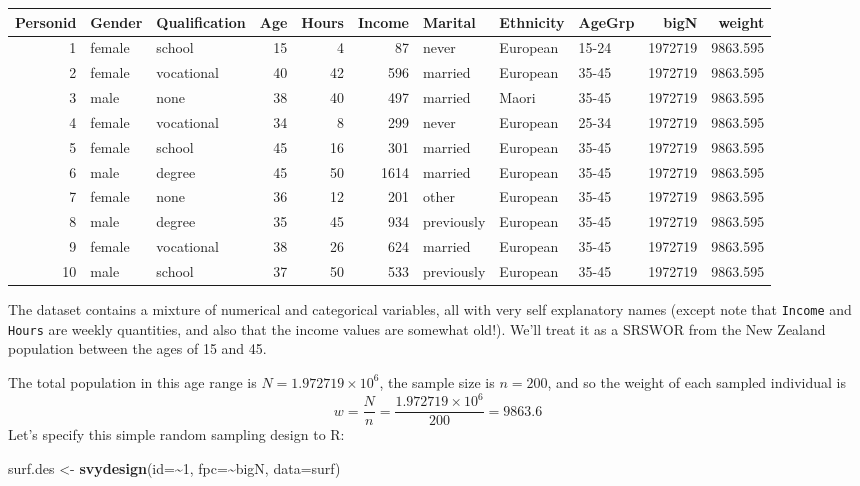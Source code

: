 \documentclass[
]{book}
\newenvironment{Shaded}{\begin{snugshade}}{\end{snugshade}}
\newcommand{\AttributeTok}[1]{\textcolor[rgb]{0.13,0.29,0.53}{#1}}
\newcommand{\DecValTok}[1]{\textcolor[rgb]{0.00,0.00,0.81}{#1}}
\newcommand{\FunctionTok}[1]{\textcolor[rgb]{0.13,0.29,0.53}{\textbf{#1}}}
\newcommand{\NormalTok}[1]{#1}
\newcommand{\OtherTok}[1]{\textcolor[rgb]{0.56,0.35,0.01}{#1}}
\newcommand{\SpecialCharTok}[1]{\textcolor[rgb]{0.81,0.36,0.00}{\textbf{#1}}}
\newcounter{none} %
\begin{document}
\begin{table}
\centering
\begin{tabular}[t]{r|l|l|r|r|r|l|l|l|r|r}
\hline
Personid & Gender & Qualification & Age & Hours & Income & Marital & Ethnicity & AgeGrp & bigN & weight\\
\hline
1 & female & school & 15 & 4 & 87 & never & European & 15-24 & 1972719 & 9863.595\\
\hline
2 & female & vocational & 40 & 42 & 596 & married & European & 35-45 & 1972719 & 9863.595\\
\hline
3 & male & none & 38 & 40 & 497 & married & Maori & 35-45 & 1972719 & 9863.595\\
\hline
4 & female & vocational & 34 & 8 & 299 & never & European & 25-34 & 1972719 & 9863.595\\
\hline
5 & female & school & 45 & 16 & 301 & married & European & 35-45 & 1972719 & 9863.595\\
\hline
6 & male & degree & 45 & 50 & 1614 & married & European & 35-45 & 1972719 & 9863.595\\
\hline
7 & female & none & 36 & 12 & 201 & other & European & 35-45 & 1972719 & 9863.595\\
\hline
8 & male & degree & 35 & 45 & 934 & previously & European & 35-45 & 1972719 & 9863.595\\
\hline
9 & female & vocational & 38 & 26 & 624 & married & European & 35-45 & 1972719 & 9863.595\\
\hline
10 & male & school & 37 & 50 & 533 & previously & European & 35-45 & 1972719 & 9863.595\\
\hline
\end{tabular}
\end{table}

The dataset contains a mixture of numerical and categorical variables, all with very
self explanatory names (except note that \texttt{Income} and \texttt{Hours} are weekly quantities,
and also that the income values are somewhat old!). We'll treat it as a SRSWOR from
the New Zealand population between the ages of 15 and 45.

The total population in this age range is \(N=\ensuremath{1.972719\times 10^{6}}\), the sample size is \(n=200\),
and so the weight of each sampled individual is
\[
   w = \frac{N}{n} = \frac{\ensuremath{1.972719\times 10^{6}}}{200} = 9863.6
\]
Let's specify this simple random sampling design to R:

\begin{Shaded}
\begin{Highlighting}[]
\NormalTok{surf.des }\OtherTok{\textless{}{-}} \FunctionTok{svydesign}\NormalTok{(}\AttributeTok{id=}\SpecialCharTok{\textasciitilde{}}\DecValTok{1}\NormalTok{, }\AttributeTok{fpc=}\SpecialCharTok{\textasciitilde{}}\NormalTok{bigN, }\AttributeTok{data=}\NormalTok{surf)}
\end{Highlighting}
\end{Shaded}
\end{document}

